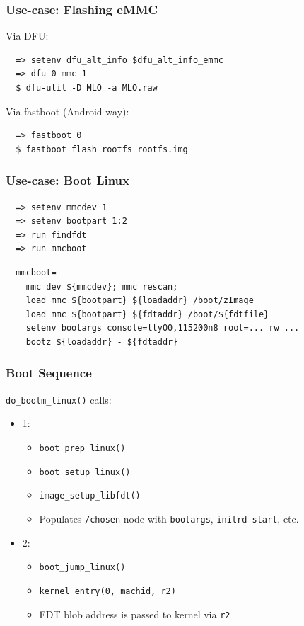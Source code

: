 \documentclass[aspectratio=169]{beamer}
\begin{document}
\begin{frame}[fragile]
  \frametitle{Use-case: Flashing eMMC}
  Via DFU:
  \begin{verbatim}
  => setenv dfu_alt_info $dfu_alt_info_emmc
  => dfu 0 mmc 1
  $ dfu-util -D MLO -a MLO.raw
  \end{verbatim}
  \pause
  Via fastboot (Android way):
  \begin{verbatim}
  => fastboot 0
  $ fastboot flash rootfs rootfs.img
  \end{verbatim}
\end{frame}

\begin{frame}[fragile]
  \frametitle{Use-case: Boot Linux}
  \begin{verbatim}
  => setenv mmcdev 1
  => setenv bootpart 1:2
  => run findfdt
  => run mmcboot
  \end{verbatim}
  \vspace*{-5mm} %
  \pause
  \begin{verbatim}
  mmcboot=
    mmc dev ${mmcdev}; mmc rescan;
    load mmc ${bootpart} ${loadaddr} /boot/zImage
    load mmc ${bootpart} ${fdtaddr} /boot/${fdtfile}
    setenv bootargs console=ttyO0,115200n8 root=... rw ...
    bootz ${loadaddr} - ${fdtaddr}
  \end{verbatim}
  \vspace*{-5mm} %
\end{frame}

\begin{frame}
  \frametitle{Boot Sequence}
  \texttt{do\_bootm\_linux()} calls:
  \begin{itemize}
    \item 1:
    \begin{itemize}
    \item \texttt{boot\_prep\_linux()}
    \item \texttt{boot\_setup\_linux()}
    \item \texttt{image\_setup\_libfdt()}
    \item Populates \texttt{/chosen} node with \texttt{bootargs},
          \texttt{initrd-start}, etc.
    \end{itemize}
    \item 2:
    \begin{itemize}
    \item \texttt{boot\_jump\_linux()}
    \item \texttt{kernel\_entry(0, machid, r2)}
    \item FDT blob address is passed to kernel via \texttt{r2}
    \end{itemize}
  \end{itemize}
\end{frame}
\end{document}
